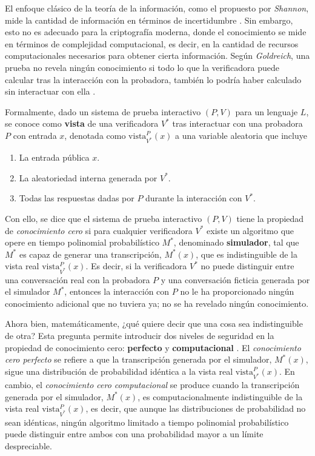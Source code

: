 \documentclass[a4paper, 11pt]{article}
\begin{document}
El enfoque clásico de la teoría de la información, como el propuesto por \textit{Shannon}, mide la
cantidad de información en términos de incertidumbre \cite{shannon1948mathematical}. Sin embargo,
esto no es adecuado para la criptografía moderna, donde el conocimiento se mide en términos de
complejidad computacional, es decir, en la cantidad de recursos computacionales necesarios para
obtener cierta información. Según \textit{Goldreich}, una prueba no revela ningún conocimiento si
todo lo que la verificadora puede calcular tras la interacción con la probadora, también lo podría
haber calculado sin interactuar con ella \cite[Capítulo~4]{goldreich2001foundations}.

Formalmente, dado un sistema de prueba interactivo $\left(P, V\right)$ para un lenguaje $L$, se
conoce como \textbf{vista} de una verificadora $V^*$ tras interactuar con una probadora $P$ con
entrada $x$, denotada como $\text{vista}_{V^*}^P(x)$ a una variable aleatoria que incluye
\begin{enumerate}
  \item La entrada pública $x$.
  \item La aleatoriedad interna generada por $V^*$.
  \item Todas las respuestas dadas por $P$ durante la interacción con $V^*$.
\end{enumerate}
Con ello, se dice que el sistema de prueba interactivo $\left(P, V\right)$ tiene la propiedad de
\textit{conocimiento cero} si para cualquier verificadora $V^*$ existe un algoritmo que opere en
tiempo polinomial probabilístico $M^*$, denominado \textbf{simulador}, tal que $M^*$ es capaz de
generar una transcripción, $M^*(x)$, que es indistinguible de la vista real $\text{vista}_{V^*}^P(x)$.
Es decir, si la verificadora $V^*$ no puede distinguir entre una conversación real con la probadora
$P$ y una conversación ficticia generada por el simulador $M^*$, entonces la interacción con $P$ no
le ha proporcionado ningún conocimiento adicional que no tuviera ya; no se ha revelado ningún
conocimiento.

Ahora bien, matemáticamente, ¿qué quiere decir que una cosa sea indistinguible de otra? Esta
pregunta permite introducir dos niveles de seguridad en la propiedad de conocimiento cero:
\textbf{perfecto} y \textbf{computacional} \cite[Capítulo~4]{goldreich2001foundations}. El
\textit{conocimiento cero perfecto} se refiere a que la transcripción generada por el simulador,
$M^*(x)$, sigue una distribución de probabilidad idéntica a la vista real $\text{vista}_{V^*}^P(x)$.
En cambio, el \textit{conocimiento cero computacional} se produce cuando la transcripción generada
por el simulador, $M^*(x)$, es computacionalmente indistinguible de la vista real
$\text{vista}_{V^*}^P(x)$, es decir, que aunque las distribuciones de probabilidad no sean idénticas,
ningún algoritmo limitado a tiempo polinomial probabilístico puede distinguir entre ambos con una
probabilidad mayor a un límite despreciable.
\end{document}
